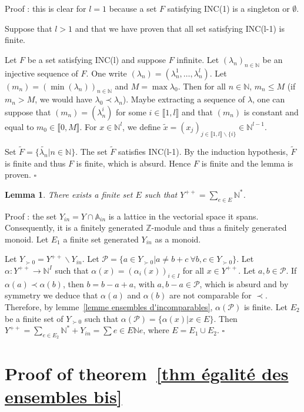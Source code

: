 \documentclass[12pt]{article}
\theoremstyle{plain}
\newtheorem{lemme}[thm]{Lemma}
\theoremstyle{definition}
\newcommand{\A}{\mathbb{A}}
\newcommand{\N}{\mathbb{N}}
\newcommand{\Z}{\mathbb{Z}}
\newcommand{\Ne}{\mathbb{N}^*}
\begin{document}
Proof : this  is clear for $l=1$ because a set $F$ satisfying INC(1) is a singleton or $\emptyset$. 

Suppose that $l>1$ and that we have proven that all set satisfying INC(l-1) is finite.

 Let $F$ be a set  satisfying INC(l) and suppose $F$ infinite. Let $(\lambda_n)_{n\in \N}$ be an injective sequence of $F$. One write $(\lambda_n)=(\lambda_n^1,\ldots,\lambda_n^l)$. Let $(m_n)=(\min(\lambda_n))_{n\in \N}$ and $M=\max \lambda_{0}$. Then for all $n\in \N$, $m_n\leq M$ (if $m_n>M$, we would have $\lambda_{0}\prec \lambda_n$). Maybe extracting a sequence of $\lambda$, one can suppose that $(m_n)=(\lambda_n^i)$ for some $i\in \llbracket 1, l\rrbracket$ and that $(m_n)$ is constant and equal to $m_0\in \llbracket 0,M\rrbracket$. For $x\in \N^l$, we define $\tilde{x}=(x_j)_{j\in \llbracket 1,l\rrbracket\backslash \{i\}}\in \N^{l-1}$. 
 
 Set $\tilde{F}=\{\tilde{\lambda_n}|n\in\N\}$. The set $\tilde{F}$ satisfies INC(l-1). By the induction hypothesis, $\tilde{F}$ is finite and thus $F$ is finite, which is absurd. Hence $F$ is finite and the lemma is proven. $\square$

\begin{lemme}\label{lemme description de Y^{++}}
There exists a finite set $E$ such that $Y^{++}=\sum_{e\in E}\Ne$.
\end{lemme}

Proof : the set $Y_{in}=Y\cap\A_{in}$ is a lattice in the vectorial space it spans. Consequently, it is a finitely generated $\Z$-module and thus a finitely generated monoid. Let $E_1$ a finite set generated $Y_{in}$ as a monoid.

 Let $Y_{\succ 0}=Y^{++}\backslash Y_{in}$. Let $\mathcal{P}=\{a\in Y_{\succ 0}|a\neq b+c\ \forall b,c\in Y_{\succ 0}\}$. Let $\alpha:Y^{++}\rightarrow \N^{I}$ such that 
 $\alpha(x)=(\alpha_i(x))_{i\in I}$ for all $x\in Y^{++}$. Let $a,b\in \mathcal{P}$.
  If $\alpha(a)\prec \alpha(b)$, then $b=b-a+a$, with $a,b-a\in \mathcal{P}$, which is absurd and by symmetry we deduce that $\alpha(a)$ and $\alpha(b)$ are not comparable for $\prec$. 
Therefore, by lemme~\ref{lemme ensembles d'incomparables}, $\alpha(\mathcal{P})$ is finite. Let $E_2$ be a finite set of $Y_{\succ 0}$ such that $\alpha(\mathcal{P})=\{\alpha(x)|x\in E\}$. Then $Y^{++}=\sum_{e\in E_2}\Ne+Y_{in}=\sum{e\in E}\N e$, where $E=E_1\cup E_2$. $\square$

 

\section{Proof of theorem~\ref{thm égalité des ensembles bis}}\label{sect proof of final theorem}
\end{document}
